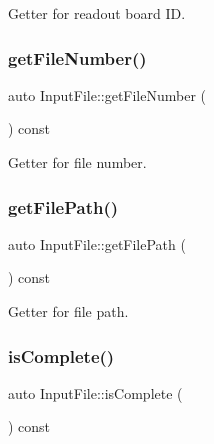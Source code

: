 Getter for readout board ID. 

\mbox{\label{class_input_file_a1a1a9c0d87f77e580e03da608b1b5291}} 
\subsubsection{\texorpdfstring{get\+File\+Number()}{getFileNumber()}}
{\footnotesize\ttfamily auto Input\+File\+::get\+File\+Number (\begin{DoxyParamCaption}{ }\end{DoxyParamCaption}) const\hspace{0.3cm}{\ttfamily [inline]}}



Getter for file number. 

\mbox{\label{class_input_file_a2e3685bddcae984f458e7fc6a20e7a44}} 
\subsubsection{\texorpdfstring{get\+File\+Path()}{getFilePath()}}
{\footnotesize\ttfamily auto Input\+File\+::get\+File\+Path (\begin{DoxyParamCaption}{ }\end{DoxyParamCaption}) const\hspace{0.3cm}{\ttfamily [inline]}}



Getter for file path. 

\mbox{\label{class_input_file_a65406d6a016391c2cccb0e6e4ee08099}} 
\subsubsection{\texorpdfstring{is\+Complete()}{isComplete()}}
{\footnotesize\ttfamily auto Input\+File\+::is\+Complete (\begin{DoxyParamCaption}{ }\end{DoxyParamCaption}) const\hspace{0.3cm}{\ttfamily [inline]}}



